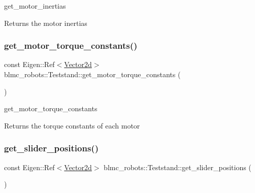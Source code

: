 get\+\_\+motor\+\_\+inertias 

\begin{DoxyReturn}{Returns}
the motor inertias 
\end{DoxyReturn}
\mbox{\label{classblmc__robots_1_1Teststand_a483bc937ac8c95b93bb90c47744da2e8}} 
\subsubsection{\texorpdfstring{get\+\_\+motor\+\_\+torque\+\_\+constants()}{get\_motor\_torque\_constants()}}
{\footnotesize\ttfamily const Eigen\+::\+Ref$<$\hyperlink{common__header_8hpp_acb6916bc8c9fe9d98c484fd4cc201447}{Vector2d}$>$ blmc\+\_\+robots\+::\+Teststand\+::get\+\_\+motor\+\_\+torque\+\_\+constants (\begin{DoxyParamCaption}{ }\end{DoxyParamCaption})\hspace{0.3cm}{\ttfamily [inline]}}



get\+\_\+motor\+\_\+torque\+\_\+constants 

\begin{DoxyReturn}{Returns}
the torque constants of each motor 
\end{DoxyReturn}
\mbox{\label{classblmc__robots_1_1Teststand_af46acfc1bd408d40b850c4780e834f53}} 
\subsubsection{\texorpdfstring{get\+\_\+slider\+\_\+positions()}{get\_slider\_positions()}}
{\footnotesize\ttfamily const Eigen\+::\+Ref$<$\hyperlink{common__header_8hpp_acb6916bc8c9fe9d98c484fd4cc201447}{Vector2d}$>$ blmc\+\_\+robots\+::\+Teststand\+::get\+\_\+slider\+\_\+positions (\begin{DoxyParamCaption}{ }\end{DoxyParamCaption})\hspace{0.3cm}{\ttfamily [inline]}}



